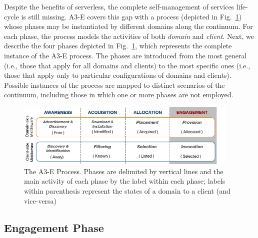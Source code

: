 Despite the benefits of serverless, the complete self-management of services life-cycle is still missing. A3-E covers this gap with a process (depicted in Fig.~\ref{fig:A3-E-process}) whose phases may be instantiated by different domains along the continuum. For each phase, the process models the activities of both \textit{domain} and \textit{client}. Next, we describe the four phases depicted in Fig.~\ref{fig:A3-E-process}, which represents the complete instance of the A3-E process. The phases are introduced from the most general (i.e., those that apply for all domains and clients) to the most specific ones (i.e., those that apply only to particular configurations of domains and clients). Possible instances of the process are mapped to distinct scenarios of the continuum, including those in which one or more phases are not employed.


\begin{figure}[tbp]
	\includegraphics[width=0.95\textwidth]{figs/A3-E-process}
	\caption{The A3-E Process. Phases are delimited by vertical lines and the main activity of each phase by the label within each phase; labels within parenthesis represent the states of a domain to a client (and vice-versa)}
	\label{fig:A3-E-process}
\end{figure}



\subsection*{Engagement Phase}\label{sec:A3-E-engagement}

